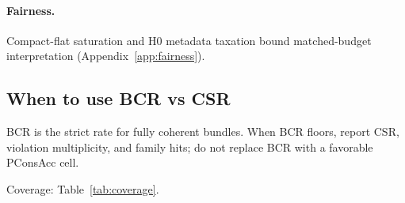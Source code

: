 \paragraph{Fairness.} Compact-flat saturation and H0 metadata taxation bound matched-budget interpretation (Appendix~\ref{app:fairness}).

\subsection{When to use BCR vs CSR}
BCR is the strict rate for fully coherent bundles. When BCR floors, report CSR, violation multiplicity, and family hits; do not replace BCR with a favorable PConsAcc cell.

Coverage: Table~\ref{tab:coverage}.
